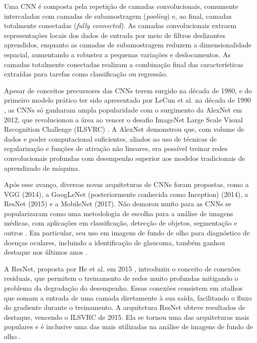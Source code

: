 \documentclass[12pt]{article}
\begin{document}
Uma CNN é composta pela repetição de camadas convolucionais, comumente intercaladas com camadas de subamostragem (\emph{pooling}) e, ao final, camadas totalmente conectadas (\emph{fully connected}). As camadas convolucionais extraem representações locais dos dados de entrada por meio de filtros deslizantes aprendidos, enquanto as camadas de subamostragem reduzem a dimensionalidade espacial, aumentando a robustez a pequenas variações e deslocamentos. \cite{goodfellow2016} As camadas totalmente conectadas realizam a combinação final das características extraídas para tarefas como classificação ou regressão.

Apesar de conceitos precursores das CNNs terem surgido na década de 1980, e do primeiro modelo prático ter sido apresentado por LeCun et al. na década de 1990 \cite{lecun1998gradient}, as CNNs só ganharam ampla popularidade com o surgimento da AlexNet em 2012, que revolucionou a área ao vencer o desafio ImageNet Large Scale Visual Recognition Challenge (ILSVRC) \cite{krizhevsky2012imagenet}. A AlexNet demonstrou que, com volume de dados e poder computacional suficientes, aliados ao uso de técnicas de regularização e funções de ativação não lineares, era possível treinar redes convolucionais profundas com desempenho superior aos modelos tradicionais de aprendizado de máquina.

Após esse avanço, diversas novas arquiteturas de CNNs foram propostas, como a VGG \cite{simonyan2015very} (2014), a GoogLeNet (posteriormente conhecida como Inception) \cite{szegedy2015going} (2014), a ResNet \cite{he2016deep} (2015) e a MobileNet \cite{howard2017mobilenet} (2017). Não demorou muito para as CNNs se popularizaram como uma metodologia de escolha para a análise de imagens médicas, com aplicações em classificação, detecção de objetos, segmentação e outros \cite{litjens_2017}. Em particular, seu uso em imagens de fundo de olho para diagnóstico de doenças oculares, incluindo a identificação de glaucoma, também ganhou destaque nos últimos anos \cite{li_review_2021}.

A ResNet, proposta por He et al. em 2015 \cite{he2016deep}, introduziu o conceito de conexões residuais, que permitem o treinamento de redes muito profundas mitigando o problema da degradação do desempenho. Essas conexões consistem em atalhos que somam a entrada de uma camada diretamente à sua saída, facilitando o fluxo do gradiente durante o treinamento. A arquitetura ResNet obteve resultados de destaque, vencendo o ILSVRC de 2015. Ela se tornou uma das arquiteturas mais populares e é inclusive uma das mais utilizadas na análise de imagens de fundo de olho \cite{li_review_2021}.
\end{document}
